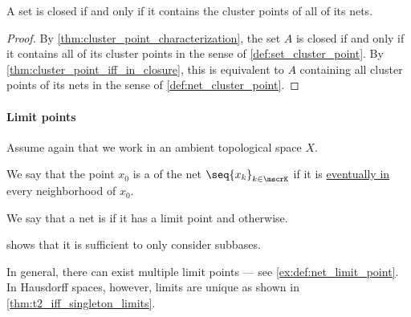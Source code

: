 \begin{corollary}\label{thm:closed_iff_contains_all_net_cluster_points}
  A set is closed if and only if it contains the cluster points of all of its nets.
\end{corollary}
\begin{proof}
  By \cref{thm:cluster_point_characterization}, the set \( A \) is closed if and only if it contains all of its cluster points in the sense of \cref{def:set_cluster_point}. By \cref{thm:cluster_point_iff_in_closure}, this is equivalent to \( A \) containing all cluster points of its nets in the sense of \cref{def:net_cluster_point}.
\end{proof}

\paragraph{Limit points}

Assume again that we work in an ambient topological space \( X \).

\begin{definition}\label{def:net_limit_point}
  We say that the point \( x_0 \) is a  of the net \( \seq{ x_k }_{k \in \mscrK} \) if it is \hyperref[def:net_eventually_in]{eventually in} every neighborhood of \( x_0 \).

  We say that a net is  if it has a limit point and  otherwise.
\end{definition}
\begin{comments}
  \item {} shows that it is sufficient to only consider subbases.

  \item In general, there can exist multiple limit points --- see \cref{ex:def:net_limit_point}. In Hausdorff spaces, however, limits are unique as shown in \cref{thm:t2_iff_singleton_limits}.
\end{comments}

